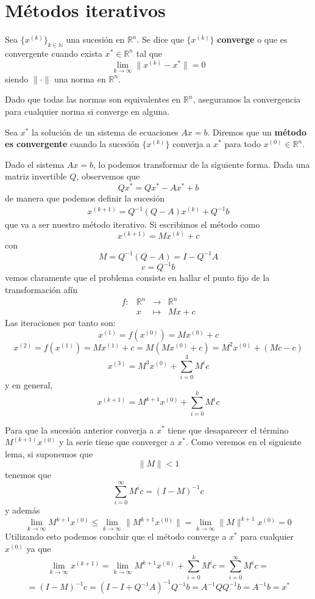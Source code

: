     \section{Métodos iterativos}
    \begin{defin} Sea $\{x^{(k)}\}_{k \in \mathbb N}$ una sucesión en $\mathbb R^n$. Se dice que $\{x^{(k)}\}$ \textbf{converge} o que es convergente cuando exista $x^*\in \mathbb R^n$ tal que 
    $$\lim_{k \to \infty} \|x^{(k)}-x^*\| = 0$$
    siendo $\|\cdot\|$ una norma en $\mathbb R^n$. 
    \end{defin}
    \begin{obs}
        Dado que todas las normas son equivalentes en $\mathbb R^n$, aseguramos la convergencia para cualquier norma si converge en alguna.
    \end{obs}
     \begin{defin}
       Sea $x^*$ la solución de un sistema de ecuaciones $Ax=b$. Diremos que un \textbf{método es convergente} cuando la sucesión $\{x^{(k)}\}$ converja a $x^*$ para todo $x^{(0)} \in \mathbb R^n$.
    \end{defin}
    \begin{met}
        Dado el sistema $Ax=b$, lo podemos transformar de la siguiente forma. Dada una matriz invertible $Q$, observemos que
        $$Qx^*=Qx^*-Ax^*+b$$
        de manera que podemos definir la sucesión 
        \begin{align}
        x^{(k+1)}=Q^{-1}(Q-A)x^{(k)}+Q^{-1}b
        \label{met:it}
        \end{align}
        que va a ser nuestro método iterativo. Si escribimos el método como 
        $$x^{(k+1)}=Mx^{(k)}+c$$
        con
        $$M=Q^{-1}(Q-A)=I-Q^{-1}A$$
        $$c=Q^{-1}b$$
        vemos claramente que el problema consiste en hallar el punto fijo de la transformación afín
        $$\begin{array}{rrcl}
             f: & \mathbb R^n & \longrightarrow & \mathbb R^n  \\
             & x & \longmapsto & Mx+c 
        \end{array}$$
        Las iteraciones por tanto son:
        $$x^{(1)}=f(x^{(0)})=Mx^{(0)}+c$$
        $$x^{(2)}=f(x^{(1)})=Mx^{(1)}+c=M(Mx^{(0)}+c)=M^2x^{(0)}+(Mc-c)$$
        $$x^{(3)}=M^3x^{(0)}+\sum_{i=0}^3 M^ic$$
        y en general, 
        $$x^{(k+1)}=M^{k+1}x^{(0)}+\sum_{i=0}^k M^i c$$

        Para que la sucesión anterior converja a $x^*$ tiene que desaparecer el término $M^{(k+1)}x^{(0)}$ y la serie tiene que converger a $x^*$. Como veremos en el siguiente lema, si suponemos que $$\|M\|<1$$ tenemos que
        $$\sum_{i=0}^{\infty}M^ic=(I-M)^{-1}c$$
        y además
        $$\lim_{k\to\infty}M^{k+1}x^{(0)}\leq \lim_{k\to\infty}\|M^{k+1}x^{(0)}\|=\lim_{k\to\infty}\|M\|^{k+1}x^{(0)}=0 $$
        Utilizando esto podemos concluir que el método converge a $x^*$ para cualquier $x^{(0)}$ ya que
        $$\lim_{k\to\infty}x^{(k+1)}=\lim_{k\to\infty} M^{k+1}x^{(0)}+\sum_{i=0}^k M^i c=\sum_{i=0}^{\infty}M^ic= $$
        $$=(I-M)^{-1}c=(I-I+Q^{-1}A)^{-1}Q^{-1}b=A^{-1}QQ^{-1}b=A^{-1}b=x^*$$
         \end{met}
